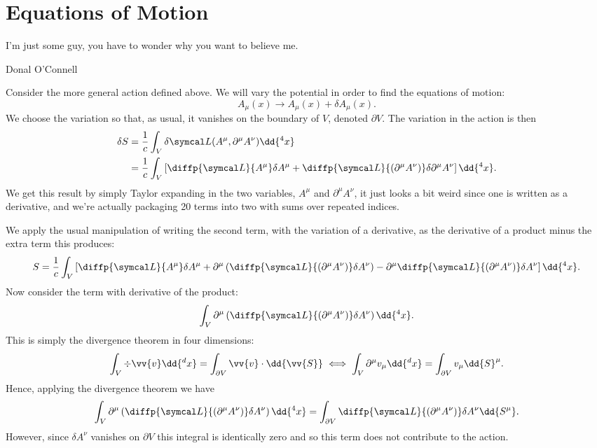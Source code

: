\section{Equations of Motion}
\epigraph{I'm just some guy, you have to wonder why you want to believe me.}{Donal O'Connell}
Consider the more general action defined above.
We will vary the potential in order to find the equations of motion:
\begin{equation}
    A_\mu(x) \to A_\mu(x) + \delta A_\mu(x).
\end{equation}
We choose the variation so that, as usual, it vanishes on the boundary of \(V\), denoted \(\partial V\).
The variation in the action is then
\begin{align}
    \delta S &= \frac{1}{c} \int_V \delta \lagrangianDensity(A^\mu, \partial^\mu A^\nu) \dd{^4x}\\
    &= \frac{1}{c} \int_V \left[ \diffp{\lagrangianDensity}{A^\mu} \delta A^\mu + \diffp{\lagrangianDensity}{(\partial^\mu A^\nu)} \delta \partial^\mu A^\nu \right] \dd{^4x}.
\end{align}
We get this result by simply Taylor expanding in the two variables, \(A^\mu\) and \(\partial^\mu A^\nu\), it just looks a bit weird since one is written as a derivative, and we're actually packaging 20 terms into two with sums over repeated indices.

We apply the usual manipulation of writing the second term, with the variation of a derivative, as the derivative of a product minus the extra term this produces:
\begin{equation}
    S = \frac{1}{c} \int_V \left[ \diffp{\lagrangianDensity}{A^\mu} \delta A^\mu + \partial^\mu\left( \diffp{\lagrangianDensity}{(\partial^\mu A^\nu)} \delta A^\nu \right) - \partial^\mu\diffp{\lagrangianDensity}{(\partial^\mu A^\nu)} \delta A^\nu \right] \dd{^4x}.
\end{equation}
Now consider the term with derivative of the product:
\begin{equation}
    \int_V \partial^\mu \left( \diffp{\lagrangianDensity}{(\partial^\mu A^\nu)} \delta A^\nu \right) \dd{^4x}.
\end{equation}
This is simply the divergence theorem in four dimensions:
\begin{equation}
    \int_V \div \vv{v} \dd{^d x} = \int_{\partial V} \vv{v} \cdot \dd{\vv{S}} \iff \int_V \partial^\mu v_\mu \dd{^dx} = \int_{\partial V} v_\mu \dd{S}^\mu.
\end{equation}
Hence, applying the divergence theorem we have
\begin{equation}
    \int_V \partial^\mu\left( \diffp{\lagrangianDensity}{(\partial^\mu A^\nu)} \delta A^\nu \right) \dd{^4x} = \int_{\partial V} \diffp{\lagrangianDensity}{(\partial^\mu A^\nu)} \delta A^\nu \dd{S^\mu}.
\end{equation}
However, since \(\delta A^\nu\) vanishes on \(\partial V\) this integral is identically zero and so this term does not contribute to the action.

